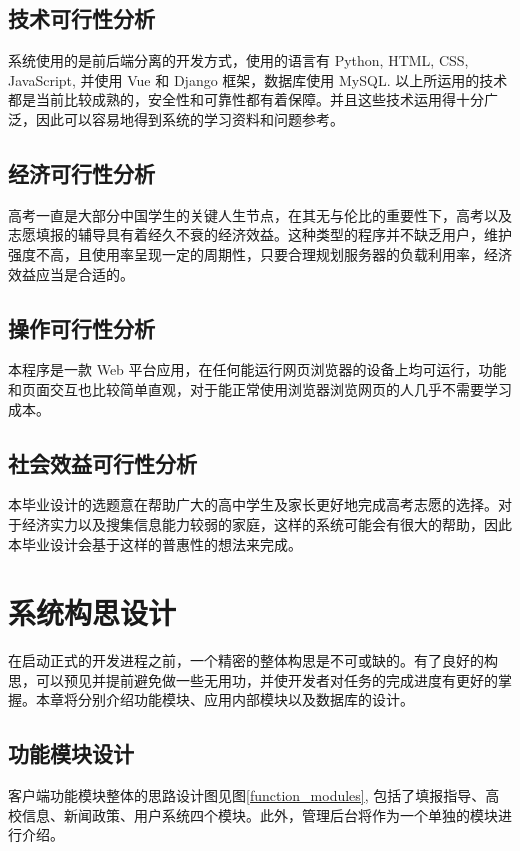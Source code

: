 \documentclass[a4paper,AutoFakeBold,oneside,12pt]{book}
\begin{document}
\section{技术可行性分析}
系统使用的是前后端分离的开发方式，使用的语言有 Python, HTML, CSS, JavaScript, 并使用 Vue 和 Django 框架，数据库使用 MySQL. 以上所运用的技术都是当前比较成熟的，安全性和可靠性都有着保障。并且这些技术运用得十分广泛，因此可以容易地得到系统的学习资料和问题参考。

\section{经济可行性分析}
高考一直是大部分中国学生的关键人生节点，在其无与伦比的重要性下，高考以及志愿填报的辅导具有着经久不衰的经济效益。这种类型的程序并不缺乏用户，维护强度不高，且使用率呈现一定的周期性，只要合理规划服务器的负载利用率，经济效益应当是合适的。

\section{操作可行性分析}
本程序是一款 Web 平台应用，在任何能运行网页浏览器的设备上均可运行，功能和页面交互也比较简单直观，对于能正常使用浏览器浏览网页的人几乎不需要学习成本。

\section{社会效益可行性分析}
本毕业设计的选题意在帮助广大的高中学生及家长更好地完成高考志愿的选择。对于经济实力以及搜集信息能力较弱的家庭，这样的系统可能会有很大的帮助，因此本毕业设计会基于这样的普惠性的想法来完成。


\chapter{系统构思设计}
在启动正式的开发进程之前，一个精密的整体构思是不可或缺的。有了良好的构思，可以预见并提前避免做一些无用功，并使开发者对任务的完成进度有更好的掌握。本章将分别介绍功能模块、应用内部模块以及数据库的设计。

\section{功能模块设计}
客户端功能模块整体的思路设计图见图\ref{function_modules}, 包括了填报指导、高校信息、新闻政策、用户系统四个模块。此外，管理后台将作为一个单独的模块进行介绍。
\end{document}

